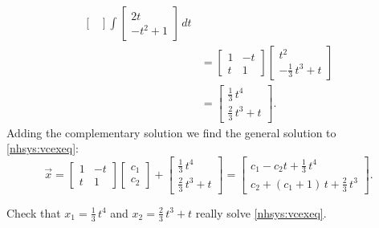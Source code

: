 \documentclass{ximera}
\begin{document}
\begin{exampleSol}
\begin{equation*}
\begin{split}
\begin{bmatrix}
            \end{bmatrix} 
            \int
            \begin{bmatrix}
                2t \\
                -t^2 + 1
            \end{bmatrix} 
            \,dt \\
            & =
            \begin{bmatrix}
                1 & -t \\
                t & 1
            \end{bmatrix} 
            \begin{bmatrix}
                t^2 \\
                -\frac{1}{3}\,t^3 + t
            \end{bmatrix} 
            \\
            & =
            \begin{bmatrix}
                \frac{1}{3}\,t^4 \\
                \frac{2}{3}\,t^3 + t
            \end{bmatrix}  .
        \end{split}
    \end{equation*}
    Adding the complementary solution we find the general solution to \eqref{nhsys:vcexeq}:
    \begin{equation*}
        \vec{x} =
        \begin{bmatrix}
            1 & -t \\
            t & 1
        \end{bmatrix}
        \begin{bmatrix}
            c_1 \\ 
            c_2
        \end{bmatrix}
        +
        \begin{bmatrix}
            \frac{1}{3}\,t^4 \\
            \frac{2}{3}\,t^3 + t
        \end{bmatrix}
        =
        \begin{bmatrix}
            c_1 - c_2 t + \frac{1}{3}\,t^4 \\
            c_2 + (c_1 + 1)\, t + \frac{2}{3}\,t^3
        \end{bmatrix} .
    \end{equation*}
\end{exampleSol}

\begin{exercise}
Check that $x_1 = \frac{1}{3}\,t^4$ and $x_2 = \frac{2}{3}\,t^3 + t$ really solve \eqref{nhsys:vcexeq}.
\end{exercise}
\end{document}
